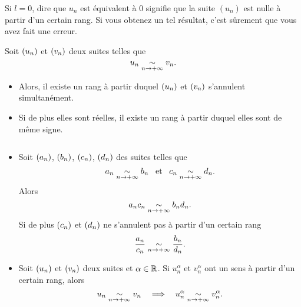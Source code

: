 \documentclass{magnoliaold}
\begin{document}
\begin{remarqueUnique}
\remarque
  Si $l=0$, dire que $u_n$ est équivalent à 0 signifie que la
  suite $(u_n)$ est nulle à partir d'un certain rang.
  Si vous obtenez un tel résultat, c'est sûrement que vous avez
  fait une erreur.
\end{remarqueUnique}


\begin{proposition}[utile=-3]
Soit $\left(u_n\right)$ et $\left(v_n\right)$ deux suites telles que
\[u_n \underset{n\rightarrow +\infty}{\sim} v_n.\]
\begin{itemize}
\item Alors, il existe un rang à partir duquel $\left(u_n\right)$ et $\left(v_n\right)$ s'annulent
  simultanément.
\item Si de plus elles sont réelles, il existe un rang à partir duquel elles
  sont de même signe. 
\end{itemize}
\end{proposition}

\begin{proposition}[utile=-3]
$\quad$
\begin{itemize}
\item Soit $\left(a_n\right)$, $\left(b_n\right)$, $\left(c_n\right)$, $\left(d_n\right)$ des suites telles que
  \[a_n \underset{n\rightarrow +\infty}{\sim} b_n \quad\!\text{et}\quad\! c_n \underset{n\rightarrow +\infty}{\sim} d_n.\]
  Alors
  \[a_n c_n \underset{n\rightarrow +\infty}{\sim}  b_n d_n.\]
  Si de plus $\left(c_n\right)$ et $\left(d_n\right)$ ne s'annulent pas à partir d'un certain
  rang
  \[\frac{a_n}{c_n} \underset{n\rightarrow +\infty}{\sim} \frac{b_n}{d_n}.\]
\item Soit $\left(u_n\right)$ et $\left(v_n\right)$ deux suites et $\alpha\in\mathbb{R}$. Si
  $u_n^\alpha$ et $v_n^\alpha$ ont un sens à partir d'un certain rang, alors
  \[u_n \underset{n\rightarrow +\infty}{\sim} v_n \quad\Longrightarrow\quad
    u_n^\alpha \underset{n\rightarrow +\infty}{\sim} v_n^\alpha.\]
\end{itemize}
\end{proposition}
\end{document}
